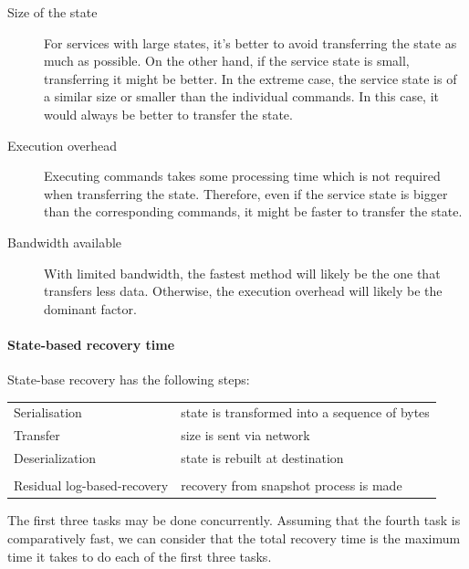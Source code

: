 \begin{description}
  \item[Size of the state] For services with large states, it's better to avoid transferring the state as much as possible. On the other hand, if the service state is small, transferring it might be better. In the extreme case, the service state is of a similar size or smaller than the individual commands. In this case, it would always be better to transfer the state.

  \item[Execution overhead] Executing commands takes some processing time which is not required when transferring the state. Therefore, even if the service state is bigger than the corresponding commands, it might be faster to transfer the state.

  \item[Bandwidth available] With limited bandwidth, the fastest  method will likely be the one that transfers less data. Otherwise, the execution overhead will likely be the dominant factor.
\end{description}

\paragraph{State-based recovery time}

State-base recovery has the following steps:

\begin{table}[H]
  \footnotesize
  \begin{center}
    \begin{tabular}{ll}
      Serialisation               & state is transformed into a sequence of bytes \\
      Transfer                    & size is sent via network \\
      Deserialization             & state is rebuilt at destination \\
      &\\
      Residual log-based-recovery & recovery from snapshot process is made \\
    \end{tabular}
  \end{center}
  \vspace{-1em}
\end{table}

The first three tasks may be done concurrently. Assuming that the fourth task is comparatively fast, we can consider that the total recovery time is the maximum time it takes to do each of the first three tasks.


